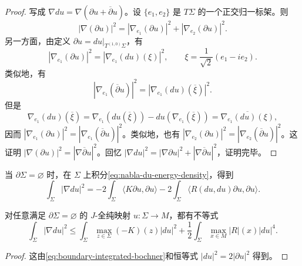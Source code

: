 \begin{proof}
写成 $\nabla du=\nabla(\partial u+\overline\partial u)$。设
$\{e_1,e_2\}$ 是 $T\Sigma$ 的一个正交归一标架。则
\[
 |\nabla(\partial u)|^2
 =|\nabla_{e_1}(\partial u)|^2+|\nabla_{e_2}(\partial u)|^2.
\]
另一方面，由定义 $\partial u=du|_{T^{(1,0)}\Sigma}$，有
\[
 |\nabla_{e_1}(\partial u)|^2
 =|\nabla_{e_1}(du)(\xi)|^2,
 \qquad
 \xi=\frac1{\sqrt2}(e_1-ie_2).
\]
类似地，有
\[
 |\nabla_{e_1}(\overline\partial u)|^2
 =|\nabla_{e_1}(du)(\overline\xi)|^2.
\]
但是
\[
 \nabla_{e_1}(du)(\overline\xi)
 =\nabla_{e_1}(du(\overline\xi))-du(\nabla_{e_1}(\overline\xi))
 =\overline{\nabla_{e_1}(du)(\xi)},
\]
因而 $|\nabla_{e_1}(\partial u)|^2=|\nabla_{e_1}(\overline\partial u)|^2$。类似地，也有
$|\nabla_{e_2}(\partial u)|^2=|\nabla_{e_2}(\overline\partial u)|^2$。这证明
$|\nabla(\partial u)|^2=|\nabla\overline\partial u|^2$。回忆
$|\nabla du|^2=|\nabla\partial u|^2+|\nabla\overline\partial u|^2$，证明完毕。
\end{proof}

当 $\partial\Sigma=\varnothing$ 时，在 $\Sigma$ 上积分\eqref{eq:nabla-du-energy-density}，得到
\begin{equation}
 \int_\Sigma|\nabla du|^2
 =-2\int_\Sigma\langle K\partial u,\partial u\rangle
 -2\int_\Sigma\langle R(du,du)\partial u,\partial u\rangle.
 \label{eq:closed-surface-integrated-bochner}
\end{equation}

\begin{proposition}\label{prop:closed-j-holomorphic-w12-bound}
对任意满足 $\partial\Sigma=\varnothing$ 的 $J$-全纯映射 $u:\Sigma\to M$，都有不等式
\begin{equation}
 \int_\Sigma|\nabla du|^2
 \leq\int_\Sigma\max_{z\in\Sigma}(-K)(z)|du|^2
 +\frac12\int_\Sigma\max_{x\in M}|R|(x)|du|^4.
 \label{eq:closed-j-holomorphic-integral-bound}
\end{equation}
\end{proposition}

\begin{proof}
这由\eqref{eq:boundary-integrated-bochner}和恒等式
$|du|^2=2|\partial u|^2$ 得到。
\end{proof}
